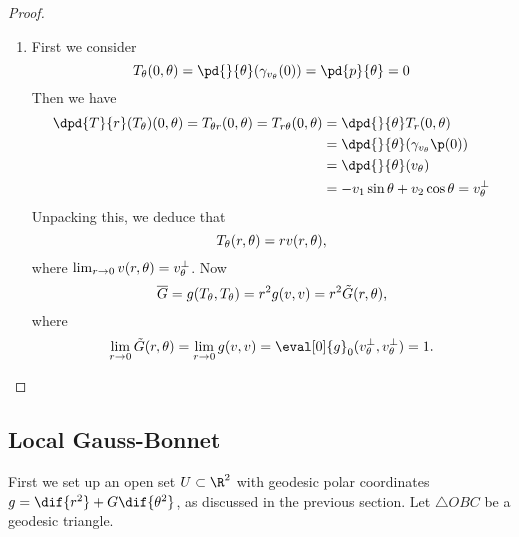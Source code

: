 \begin{proof}
\begin{enumerate}
		\item First we consider
		\begin{equation*}
			T_\theta(0,\theta) = \pd{}{\theta}(\gvt(0)) = \pd{\pp}{\theta} = \vec{0}
		\end{equation*}
		Then we have
		\begin{align*}
			\dpd{T}{r}(T_\theta)(0,\theta) = T_{\theta r}(0,\theta) = T_{r\theta}(0,\theta)
			&= \dpd{}{\theta}T_r(0,\theta) \\
			&= \dpd{}{\theta}(\gvt\p(0)) \\
			&= \dpd{}{\theta}(\vv_\theta) \\
			&= -\vv_1 \sin\theta + \vv_2 \cos\theta = \vv_\theta^\perp
		\end{align*}
		Unpacking this, we deduce that
		\begin{equation*}
			T_\theta(r,\theta) = rv(r,\theta),
		\end{equation*}
		where $\lim_{r\to 0} v(r,\theta) = v_\theta^\perp$. Now
		\begin{equation*}
			\overline{G} = g(T_\theta, T_\theta) = r^2 g(v,v) = r^2 \tilde{G}(r,\theta),
		\end{equation*}
		where
		\begin{equation*}
			\lim_{r\to 0} \tilde{G}(r,\theta) = \lim_{r \to 0} g(\vv,\vv) = \eval[0]{g}_0(\vv_\theta^\perp, \vv_\theta^\perp) = 1. \qedhere
		\end{equation*}
	\end{enumerate}
\end{proof}


\subsection{Local Gauss-Bonnet} %
\label{sub:local_gauss_bonnet}

First we set up an open set $U\subset \R^2$ with geodesic polar coordinates $g=\dif{r^2} + G\dif{\theta^2}$, as discussed in the previous section. Let $\triangle OBC$ be a geodesic triangle.

